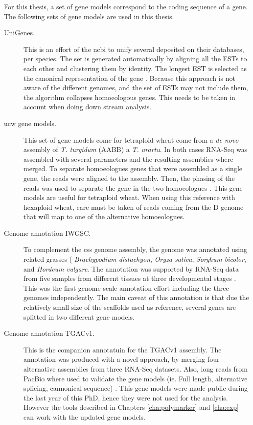 For this thesis, a set of gene models correspond to the coding sequence of a gene. 
The following sets of gene models are used in this thesis. 

\begin{description}
\item[UniGenes.] This is an effort of the \gls{ncbi} to unify several  deposited on their databases, per species.
The set is generated automatically by aligning all the ESTs to each other and clustering them by identity. 
The longest EST is selected as the canonical representation of the gene \citep{PontiusJUWagnerL2002}. 
Because this approach is not aware of the different genomes, and the set of ESTs may not include them, the algorithm  collapses homoeologous genes. 
This needs to be taken in account when doing down stream analysis. 
\item[\acrshort{ucw} gene models.] This set of gene models come for tetraploid wheat come from a \textit{de novo} assembly of \textit{T. turgidum} (AABB) a \textit{T. urartu}. 
In both cases RNA-Seq was assembled with several parameters and the resulting assemblies where merged. 
To separate homoeologues genes that were assembled as a single gene, the reads were aligned to the assembly.
Then, the phasing of the reads was used to separate the gene in the two homoeologues \citep{Krasileva2013}.
This gene models are useful for tetraploid wheat. 
When using this reference with hexaploid wheat, care must be taken of reads coming from the D genome that will map to one of the alternative homoeologues. 
\item[Genome annotation IWGSC.] To complement the \acrshort{css} genome assembly, the genome was annotated using related grasses ( \textit{Brachypodium distachyon}, \textit{Oryza sativa}, \textit{Sorghum bicolor}, and \textit{Hordeum vulgare}. 
The annotation was supported by RNA-Seq data from five samples from different tissues at three developmental stages \citep{Mayer2014}. 
This was the first genome-scale annotation effort including the three genomes independently. 
The main caveat of this annotation is that due the relatively small size of the scaffolds used as reference, several genes are splitted in two different gene models. 
\item[Genome annotation TGACv1.] This is the companion annotatuin for the TGACv1 assembly. 
The annotation was produced with a novel approach, by merging four alternative assemblies from three RNA-Seq datasets. 
Also, long reads from PacBio where used to validate the gene models (ie. Full length, alternative splicing, cannonical sequence) \citep{Venturini2016}. 
This gene models were made public during the last year of this PhD, hence they were not used for the analysis. 
However the tools described in Chapters \ref{cha:polymarker} and \ref{cha:exp} can work with the updated gene models. 
\end{description}



